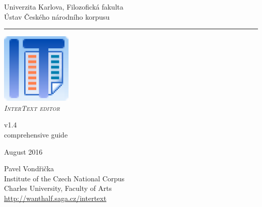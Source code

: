 \documentclass[a4paper,10pt,oneside]{book}
\newcommand{\ITeditor}{\textit{\textsc{InterText editor}}\xspace}
\begin{document}
\begin{titlepage}
\begin{center}

\begin{Large}
Univerzita Karlova, Filozofická fakulta \\
Ústav Českého národního korpusu
\end{Large}
\rule{\linewidth}{0.5mm}

\vspace*{4cm}

\begin{Huge}
\includegraphics[width=4ex]{icon.png}\\
\vspace*{1cm}
\ITeditor
\end{Huge}

\begin{huge}
v1.4\\
\medskip
comprehensive guide
\end{huge}
\bigskip

\begin{Large}
August 2016\\
\end{Large}



\bigskip

\vspace*{2.5cm}

\begin{Large}
Pavel Vondřička\\
Institute of the Czech National Corpus\\
Charles University, Faculty of Arts\\
\bigskip
\url{http://wanthalf.saga.cz/intertext}
\end{Large}

\end{center}

\end{titlepage}
\thispagestyle{empty}
\end{document}

